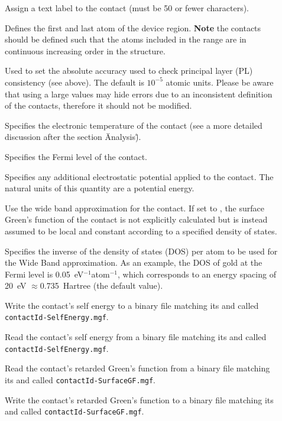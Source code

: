\begin{description}
\item[] Assign a text label to the contact (must be 50 or fewer
  characters).
\item[]  Defines the first and last atom of the
  device region.  {\bf Note} the contacts should be defined such that the atoms
  included in the range are in continuous increasing order in the structure.
\item[] Used to set the absolute
  accuracy used to check principal layer (PL) consistency (see above). The
  default is $10^{-5}$ atomic units. Please be aware that using a large values
  may hide errors due to an inconsistent definition of the contacts, therefore
  it should not be modified.
\item[] Specifies the electronic
  temperature of the contact (see a more detailed discussion after the section 
  \"Analysis\").
\item[] Specifies the Fermi level of the
  contact.
\item[] Specifies any additional
  electrostatic potential applied to the contact. The natural units of this
  quantity are a potential energy.
\item[] Use the wide band approximation for the contact. If set to
  , the surface Green's function of the contact is not explicitly
  calculated but is instead assumed to be local and constant according to a
  specified density of states.
\item[] Specifies the inverse of the
  density of states (DOS) per atom to be used for the Wide Band
  approximation. As an example, the DOS of gold at the Fermi level is
  0.05~eV$^{-1}$atom$^{-1}$, which corresponds to an energy spacing of 20~eV
  $\approx$0.735~Hartree (the default value).
\item[] Write the contact's self energy to a binary file
  matching its  and called \verb|contactId-SelfEnergy.mgf|.
\item[] Read the contact's self energy from a binary file
  matching its  and called \verb|contactId-SelfEnergy.mgf|.
\item[] Read the contact's retarded Green's function from a
  binary file matching its  and called
  \verb|contactId-SurfaceGF.mgf|.
\item[] Write the contact's retarded Green's function to a
  binary file matching its  and called
  \verb|contactId-SurfaceGF.mgf|.
\end{description}

